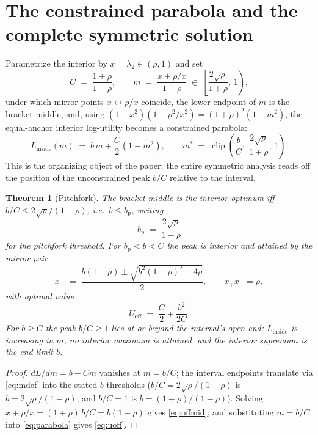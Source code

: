 \documentclass[11pt]{article}
\theoremstyle{itheads}
\newtheorem{theorem}{Theorem}
\begin{document}
\section{The constrained parabola and the complete symmetric solution}

Parametrize the interior by $x=\lambda_2\in(\rho,1)$ and set
\begin{equation}\label{eq:mdef}
C \;=\; \frac{1+\rho}{1-\rho},
\qquad
m \;=\; \frac{x+\rho/x}{1+\rho}
\;\in\;\left[\frac{2\sqrt{\rho}}{1+\rho},\,1\right),
\end{equation}
under which mirror points $x\leftrightarrow\rho/x$ coincide, the lower
endpoint of $m$ is the bracket middle, and, using
$\left(1-x^{2}\right)\left(1-\rho^{2}/x^{2}\right)
=\left(1+\rho\right)^{2}\left(1-m^{2}\right)$, the equal-anchor
interior log-utility becomes a constrained parabola:
\begin{equation}\label{eq:parabola}
L_{\mathrm{inside}}(m) \;=\; b\,m + \frac{C}{2}\left(1-m^{2}\right),
\qquad
m^{*} \;=\; \operatorname{clip}\!\left(\frac{b}{C};\;
\frac{2\sqrt{\rho}}{1+\rho},\,1\right).
\end{equation}
This is the organizing object of the paper: the entire symmetric
analysis reads off the position of the unconstrained peak $b/C$
relative to the interval.

\begin{theorem}[Pitchfork]\label{thm:pitchfork}
The bracket middle is the interior optimum iff
$b/C\le 2\sqrt{\rho}/(1+\rho)$, i.e.\ $b\le b_{\mathrm p}$, writing
\begin{equation}\label{eq:pitch}
b_{\mathrm p} \;=\; \frac{2\sqrt{\rho}}{1-\rho}
\end{equation}
for the pitchfork threshold.
For $b_{\mathrm p}<b<C$ the peak is interior and attained by
the mirror pair
\begin{equation}\label{eq:offmid}
x_{\pm} \;=\; \frac{b\left(1-\rho\right)
\pm\sqrt{b^{2}\left(1-\rho\right)^{2}-4\rho}}{2},
\qquad x_{+}x_{-}=\rho,
\end{equation}
with optimal value
\begin{equation}\label{eq:uoff}
U_{\mathrm{off}} \;=\; \frac{C}{2}+\frac{b^{2}}{2C}.
\end{equation}
For $b\ge C$ the peak $b/C\ge 1$ lies at or beyond the
interval's open end: $L_{\mathrm{inside}}$ is increasing in $m$, no
interior maximum is attained, and the interior supremum is the end
limit $b$.
\end{theorem}

\begin{proof}
$dL/dm=b-Cm$ vanishes at $m=b/C$; the interval endpoints translate
via \eqref{eq:mdef} into the stated $b$-thresholds
($b/C=2\sqrt{\rho}/(1+\rho)$ is $b=2\sqrt{\rho}/(1-\rho)$, and
$b/C=1$ is $b=(1+\rho)/(1-\rho)$). Solving $x+\rho/x=(1+\rho)\,b/C
=b\left(1-\rho\right)$ gives \eqref{eq:offmid}, and substituting
$m=b/C$ into \eqref{eq:parabola} gives \eqref{eq:uoff}.
\end{proof}
\end{document}
